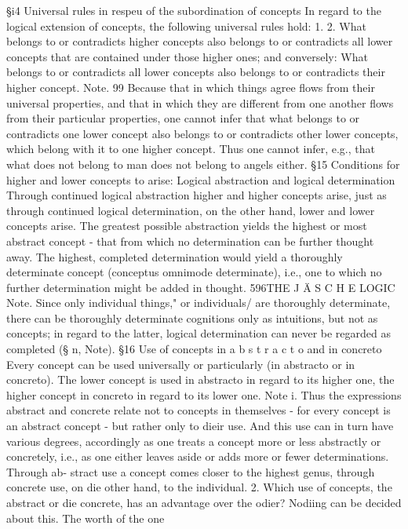 §i4
Universal rules in respeu of the subordination of concepts
In regard to the logical extension of concepts, the following universal rules
hold:
1.
2.
What belongs to or contradicts higher concepts also belongs to or contradicts
all lower concepts that are contained under those higher ones; and
conversely: What belongs to or contradicts all lower concepts also belongs to
or contradicts their higher concept.
Note.
99
Because that in which things agree flows from their universal properties,
and that in which they are different from one another flows from their
particular properties, one cannot infer that what belongs to or contradicts
one lower concept also belongs to or contradicts other lower concepts,
which belong with it to one higher concept. Thus one cannot infer, e.g.,
that what does not belong to man does not belong to angels either.
§15
Conditions for higher and lower concepts to arise: Logical abstraction
and logical determination
Through continued logical abstraction higher and higher concepts arise,
just as through continued logical determination, on the other hand, lower
and lower concepts arise. The greatest possible abstraction yields the
highest or most abstract concept - that from which no determination can
be further thought away. The highest, completed determination would
yield a thoroughly determinate concept (conceptus omnimode determinate),
i.e., one to which no further determination might be added in thought.
596THE J Ä S C H E LOGIC
Note.
Since only individual things," or individuals/ are thoroughly determinate,
there can be thoroughly determinate cognitions only as intuitions, but not
as concepts; in regard to the latter, logical determination can never be
regarded as completed (§ n, Note).
§16
Use of concepts in a b s t r a c t o and in concreto
Every concept can be used universally or particularly (in abstracto or in
concreto). The lower concept is used in abstracto in regard to its higher one,
the higher concept in concreto in regard to its lower one.
Note i. Thus the expressions abstract and concrete relate not to concepts in
themselves - for every concept is an abstract concept - but rather only to
dieir use. And this use can in turn have various degrees, accordingly as
one treats a concept more or less abstractly or concretely, i.e., as one
either leaves aside or adds more or fewer determinations. Through ab-
stract use a concept comes closer to the highest genus, through concrete
use, on die other hand, to the individual.
2. Which use of concepts, the abstract or die concrete, has an advantage
over the odier? Nodiing can be decided about this. The worth of the one
